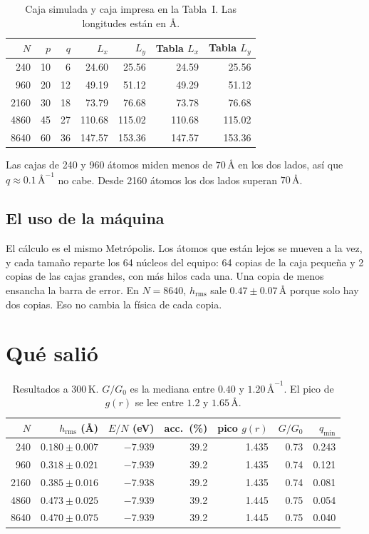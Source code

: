 \documentclass[11pt,a4paper]{article}
\begin{document}
\begin{table}[ht]
\centering
\caption{Caja simulada y caja impresa en la Tabla~I. Las longitudes están en \AA.}
\begin{tabular}{rrrrrrr}
\toprule
$N$ & $p$ & $q$ & $L_x$ & $L_y$ & Tabla $L_x$ & Tabla $L_y$ \\
\midrule
240  & 10 &  6 &  24.60 &  25.56 &  24.59 &  25.56 \\
960  & 20 & 12 &  49.19 &  51.12 &  49.29 &  51.12 \\
2160 & 30 & 18 &  73.79 &  76.68 &  73.78 &  76.68 \\
4860 & 45 & 27 & 110.68 & 115.02 & 110.68 & 115.02 \\
8640 & 60 & 36 & 147.57 & 153.36 & 147.57 & 153.36 \\
\bottomrule
\end{tabular}
\end{table}

Las cajas de 240 y 960 átomos miden menos de $70\,\text{\AA}$ en los dos lados, así que $q\approx 0.1\,\text{\AA}^{-1}$ no cabe.
Desde 2160 átomos los dos lados superan $70\,\text{\AA}$.

\subsection{El uso de la máquina}

El cálculo es el mismo Metrópolis.
Los átomos que están lejos se mueven a la vez, y cada tamaño reparte los 64 núcleos del equipo: 64 copias de la caja pequeña y 2 copias de las cajas grandes, con más hilos cada una.
Una copia de menos ensancha la barra de error.
En $N=8640$, $h_{\mathrm{rms}}$ sale $0.47\pm 0.07\,\text{\AA}$ porque solo hay dos copias.
Eso no cambia la física de cada copia.

\section{Qué salió}

\begin{table}[ht]
\centering
\small
\caption{Resultados a $300\,\mathrm{K}$.
$G/G_0$ es la mediana entre $0.40$ y $1.20\,\text{\AA}^{-1}$.
El pico de $g(r)$ se lee entre $1.2$ y $1.65\,\text{\AA}$.}
\begin{tabular}{rrrrrrr}
\toprule
$N$ & $h_{\mathrm{rms}}$ (\AA) & $E/N$ (eV) & acc.\ (\%) & pico $g(r)$ & $G/G_0$ & $q_{\min}$ \\
\midrule
240  & $0.180\pm 0.007$ & $-7.939$ & 39.2 & 1.435 & 0.73 & 0.243 \\
960  & $0.318\pm 0.021$ & $-7.939$ & 39.2 & 1.435 & 0.74 & 0.121 \\
2160 & $0.385\pm 0.016$ & $-7.938$ & 39.2 & 1.435 & 0.74 & 0.081 \\
4860 & $0.473\pm 0.025$ & $-7.939$ & 39.2 & 1.445 & 0.75 & 0.054 \\
8640 & $0.470\pm 0.075$ & $-7.939$ & 39.2 & 1.445 & 0.75 & 0.040 \\
\bottomrule
\end{tabular}
\end{table}
\end{document}
